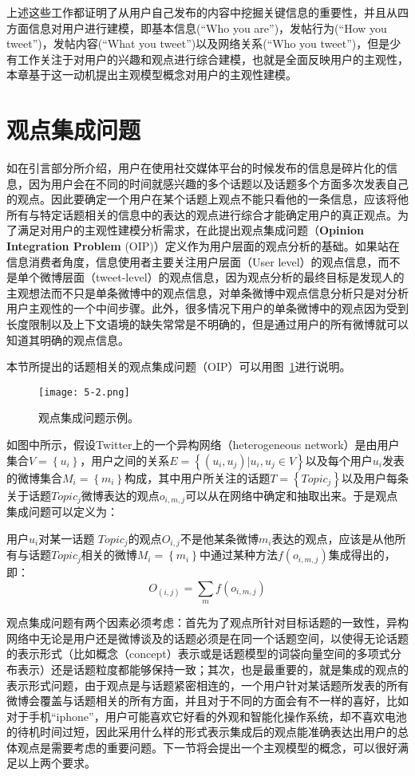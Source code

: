上述这些工作都证明了从用户自己发布的内容中挖掘关键信息的重要性，并且从四方面信息对用户进行建模，即基本信息(“Who you are”)，发帖行为(“How
you tweet”)，发帖内容(“What you tweet”)以及网络关系(“Who you tweet”)，但是少有工作关注于对用户的兴趣和观点进行综合建模，也就是全面反映用户的主观性，本章基于这一动机提出主观模型概念对用户的主观性建模。

\section{观点集成问题}
\label{sec3}
如在引言部分所介绍，用户在使用社交媒体平台的时候发布的信息是碎片化的信息，因为用户会在不同的时间就感兴趣的多个话题以及话题多个方面多次发表自己的观点。因此要确定一个用户在某个话题上观点不能只看他的一条信息，应该将他所有与特定话题相关的信息中的表达的观点进行综合才能确定用户的真正观点。为了满足对用户的主观性建模分析需求，在此提出观点集成问题（\textbf{Opinion Integration Problem} (OIP)）定义作为用户层面的观点分析的基础。如果站在信息消费者角度，信息使用者主要关注用户层面（User level）的观点信息，而不是单个微博层面（tweet-level）的观点信息，因为观点分析的最终目标是发现人的主观想法而不只是单条微博中的观点信息，对单条微博中观点信息分析只是对分析用户主观性的一个中间步骤。此外，很多情况下用户的单条微博中的观点因为受到长度限制以及上下文语境的缺失常常是不明确的，但是通过用户的所有微博就可以知道其明确的观点信息。

本节所提出的话题相关的观点集成问题（OIP）可以用图~\ref{fig5-2}进行说明。
\begin{figure}[htb]
\centering
\texttt{[image: 5-2.png]}
\caption{观点集成问题示例。}
\label{fig5-2}
\end{figure}
如图中所示，假设Twitter上的一个异构网络（heterogeneous network）是由用户集合$ V=\left\{ u_{i} \right\} $，用户之间的关系$ E=\left\{(u_{i},u_{j})| u_{i},u_{j} \in V\right\} $以及每个用户$ u_i $发表的微博集合$ M_{i}=\left\{ m_{i} \right\} $构成，其中用户所关注的话题$ T=\left\{ Topic_{j} \right\} $以及用户每条关于话题$ Topic_{j} $微博表达的观点$ o_{i,m,j} $可以从在网络中确定和抽取出来。于是观点集成问题可以定义为：
\begin{definition}[观点集成问题]
用户$ u_{i} $对某一话题 $ Topic_{j} $的观点$ O_{i,j} $不是他某条微博$ m_{i} $表达的观点，应该是从他所有与话题$ Topic_{j} $相关的微博$ M_{i}=\left\{ m_{i} \right\} $中通过某种方法$ f(o_{i,m,j}) $集成得出的，即：$$ O_(i,j)=\sum_mf(o_{i,m,j})$$
\end{definition}

观点集成问题有两个因素必须考虑：首先为了观点所针对目标话题的一致性，异构网络中无论是用户还是微博谈及的话题必须是在同一个话题空间，以使得无论话题的表示形式（比如概念（concept）表示或是话题模型的词袋向量空间的多项式分布表示）还是话题粒度都能够保持一致；其次，也是最重要的，就是集成的观点的表示形式问题，由于观点是与话题紧密相连的，一个用户针对某话题所发表的所有微博会覆盖与话题相关的所有方面，并且对于不同的方面会有不一样的喜好，比如对于手机“iphone”，用户可能喜欢它好看的外观和智能化操作系统，却不喜欢电池的待机时间过短，因此采用什么样的形式表示集成后的观点能准确表达出用户的总体观点是需要考虑的重要问题。下一节将会提出一个主观模型的概念，可以很好满足以上两个要求。

